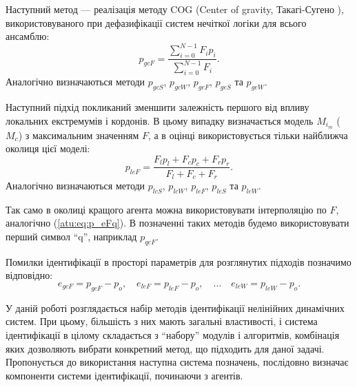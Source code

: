 \documentclass[a4paper,13pt]{atuaref}
\begin{document}
Наступний метод --- реалізація методу COG (Center of gravity, Такагі-Сугено \cite{atu_asau25,atu_csit2015,atu_asau16}),
використовуваного при дефазифікації систем нечіткої логіки для всього
ансамблю:
%
\begin{equation}
  p_{gcF}
  =
  \frac{\sum\limits_{i=0}^{N-1} F_{i} p_{i}}
       {\sum\limits_{i=0}^{N-1} F_{i} }
  .
  \label{atu:eq:p_gcF}
\end{equation}
%
Аналогічно визначаються методи
$p_{gcS}$,
$p_{gcW}$,
$p_{geF}$,
$p_{geS}$ та
$p_{geW}$.


Наступний підхід покликаний зменшити залежність першого від впливу локальних
екстремумів і кордонів. В цьому випадку визначається модель $ M_{i_{m}} $ ($ M_{c} $) з
максимальним значенням $ F $, а в оцінці використовується тільки найближча
околиця цієї моделі:
%
\begin{equation}
  p_{leF}
  =
  \frac{ F_{l} p_{l} + F_{c} p_{c} + F_{r} p_{r} }
       { F_{l}       + F_{c}       + F_{r}       }
  .
  \label{atu:eq:p_lcFl}
\end{equation}
%
Аналогічно визначаються методи
$p_{lcS}$,
$p_{lcW}$,
$p_{leF}$,
$p_{leS}$ та
$p_{leW}$.


Так само в околиці кращого агента можна використовувати інтерполяцію по
$ F $, аналогічно (\ref{atu:eq:p_eFq}). В позначенні таких методів будемо
використовувати перший символ ``q'', наприклад $ p_{qeF}$.

Помилки ідентифікації в просторі параметрів для розглянутих підходів позначимо відповідно:
%
\begin{equation}
  e_{gcF} = p_{gcF} - p_o,
  \quad
  e_{leF} = p_{leF} - p_o,
  \quad
  \ldots
  \quad
  e_{leW} = p_{leW} - p_o.
  \label{atu:eq:e_xx}
\end{equation}
%

У даній роботі розглядається набір методів ідентифікації нелінійних динамічних
систем. При цьому, більшість з них мають загальні властивості, і система
ідентифікації в цілому складається з ``набору'' модулів і алгоритмів,
комбінація яких дозволяють вибрати конкретний метод, що підходить для даної
задачі.
Пропонується до використання наступна система позначень, послідовно визначає
компоненти системи ідентифікації, починаючи з агентів.
\end{document}
